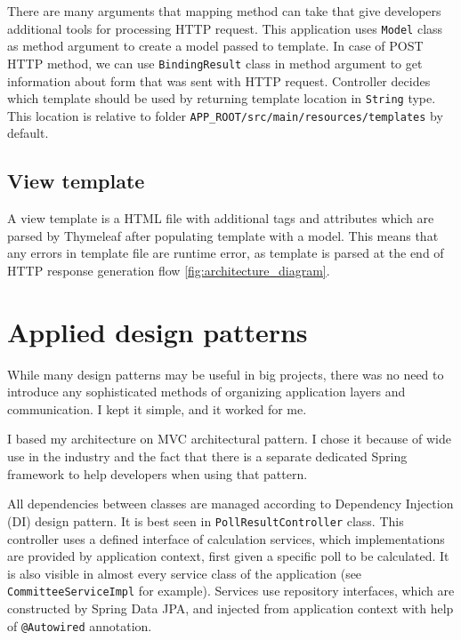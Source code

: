 \documentclass[a4paper,twoside,12pt]{book}
\begin{document}
      There are many arguments that mapping method can take that give developers additional tools for processing HTTP request.
      This application uses \lstinline|Model| class as method argument to create a model passed to template.
      In case of POST HTTP method, we can use \lstinline|BindingResult| class in method argument to get information about form that was sent with HTTP request.
      Controller decides which template should be used by returning template location in \lstinline|String| type.
      This location is relative to folder \lstinline[language=bash]|APP_ROOT/src/main/resources/templates| by default.

    \subsection{View template}
      A view template is a HTML file with additional tags and attributes which are parsed by Thymeleaf after populating template with a model.
      This means that any errors in template file are runtime error, as template is parsed at the end of HTTP response generation flow \ref{fig:architecture_diagram}.

  \section{Applied design patterns}
    While many design patterns may be useful in big projects, there was no need to introduce any sophisticated methods of organizing application layers and communication.
    I kept it simple, and it worked for me. 

    I based my architecture on MVC architectural pattern. 
    I chose it because of wide use in the industry and the fact that there is a separate dedicated Spring framework to help developers when using that pattern. 

    All dependencies between classes are managed according to Dependency Injection (DI) design pattern. It is best seen in \lstinline|PollResultController| class. 
    This controller uses a defined interface of calculation services, which implementations are provided by application context, first given a specific poll to be calculated.
    It is also visible in almost every service class of the application (see \lstinline|CommitteeServiceImpl| for example). 
    Services use repository interfaces, which are constructed by Spring Data JPA, and injected from application context with help of \lstinline|@Autowired| annotation.
  
\end{document}

